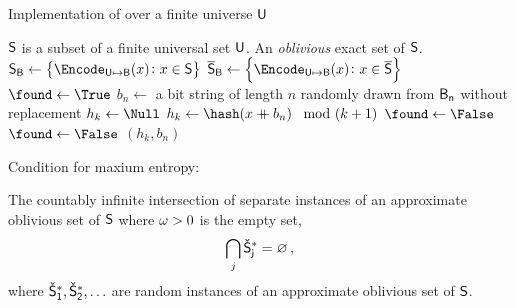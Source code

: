 \documentclass[ ../main.tex]{subfiles}
\begin{document}
\begin{algorithm}
    \caption{Implementation of \protect\MakeApproxSet over a finite universe $\Set{U}$}
    \label{alg:makeexactobset}
    \DontPrintSemicolon
    \KwIn
    {
        $\Set{S}$ is a subset of a finite universal set $\Set{U}$.
    }
    \KwOut
    {
        An \emph{oblivious} exact set of $\Set{S}$.
    }
    {
        $\Set{S}_{\Set{B}} \gets \left\{\Encode_{\Set{U} \mapsto \Set{B}}(x) \colon x \in \Set{S}\right\}$\;
        $\Set{\overline{S}}_{\Set{B}} \gets \left\{\Encode_{\Set{U} \mapsto \Set{B}}(x) \colon x \in \Set{\overline{S}}\right\}$\;        
        {
            {
                $\found \gets \True$\;
                $b_n \gets $ a bit string of length $n$ randomly drawn from $\Set{B}[n]$ without replacement\;
                $h_k \gets \Null$\;
                {
                    {
                        $h_k \gets \hash\!\left(x \catop b_n\right) \mod (k+1)$\;
                    }
                    {
                        $\found \gets \False$\;
                    }
                }
                {
                    {
                        $\found \gets \False$\;
                    }
                }
                \If{\found}
                {
                    \Return $(h_k, b_n)$\;
                }
            }
        }
    }
\end{algorithm}



Condition for maxium entropy:

The countably infinite intersection of separate instances of an approximate oblivious set of $\Set{S}$ where $\omega > 0$ is the empty set,
\begin{equation}
    \bigcap_{j} \OASet{S}[j] = \EmptySet\,,
\end{equation}
where $\OASet{S}[1],\OASet{S}[2],\ldots$ are random instances of an approximate oblivious set of $\Set{S}$.
\end{document}
